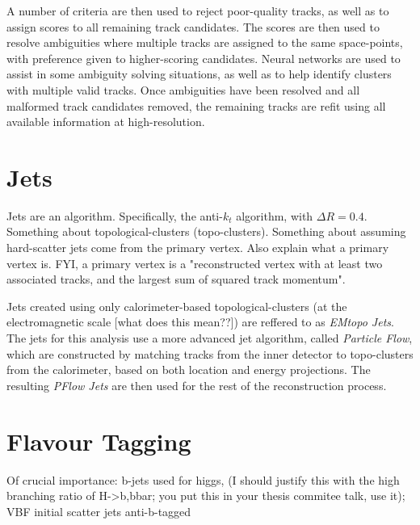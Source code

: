         A number of criteria are then used to reject poor-quality tracks, as well as to assign scores to all remaining track candidates.
        The scores are then used to resolve ambiguities where multiple tracks are assigned to the same space-points,
            with preference given to higher-scoring candidates.
        Neural networks are used to assist in some ambiguity solving situations,
            as well as to help identify clusters with multiple valid tracks.
        Once ambiguities have been resolved and all malformed track candidates removed,
            the remaining tracks are refit using all available information at high-resolution.
        \cite{atlas_track_reco_performance}

    \section{Jets}
        Jets are an algorithm.
        Specifically, the anti-$k_t$ algorithm, with $\Delta R = 0.4$.
        Something about topological-clusters (topo-clusters).
        \cite{anti_kt}
        Something about assuming hard-scatter jets come from the primary vertex.
        Also explain what a primary vertex is.
        FYI, a primary vertex is a "reconstructed vertex with at least two associated tracks, and the largest sum of squared track momentum".

        Jets created using only calorimeter-based topological-clusters (at the electromagnetic scale [what does this mean??]) %
            are reffered to as \textit{EMtopo Jets}.
        The jets for this analysis use a more advanced jet algorithm, called \textit{Particle Flow},
            which are constructed by matching tracks from the inner detector to topo-clusters from the calorimeter,
            based on both location and energy projections.
        The resulting \textit{PFlow Jets} are then used for the rest of the reconstruction process.
        \cite{pflow}
        \cite{jet_energy_scale13TeV}

    \section{Flavour Tagging}
        Of crucial importance:
            b-jets used for higgs,
                (I should justify this with the high branching ratio of H->b,bbar;
                you put this in your thesis commitee talk, use it);
            VBF initial scatter jets anti-b-tagged

